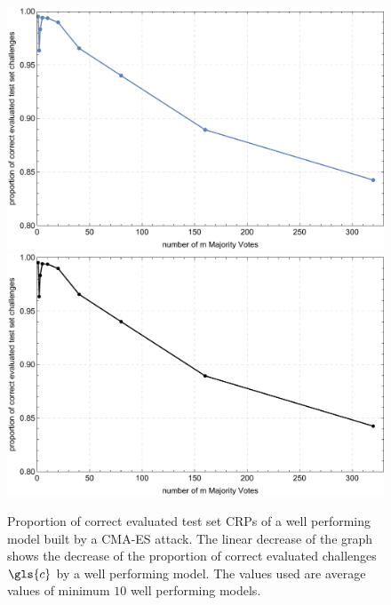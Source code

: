 \begin{figure}[ht]
\ifx{}\undefined
{}
\else
	\if{}
	\centering
	\includegraphics[width=1.00\textwidth]{images/single-mv-classification-cma-attack-correctness.pdf}
	\else
	\includegraphics[width=1.00\textwidth]{images/single-mv-classification-cma-attack-correctness_mono.pdf}
	\fi
\fi
\caption[Proportion of correct evaluated test set challenges for Arbiter \puf models and Majority Arbiter \puf models]{Proportion of correct evaluated test set \acp{CRP} of a well performing model built by a \ac{CMA-ES} attack. The linear decrease of the graph shows the decrease of the proportion of correct evaluated challenges $\gls{c}$ by a well performing model. The values used are average values of minimum $10$ well performing models.}
\label{fig:cmasingleattackcorrectness}
\end{figure}

